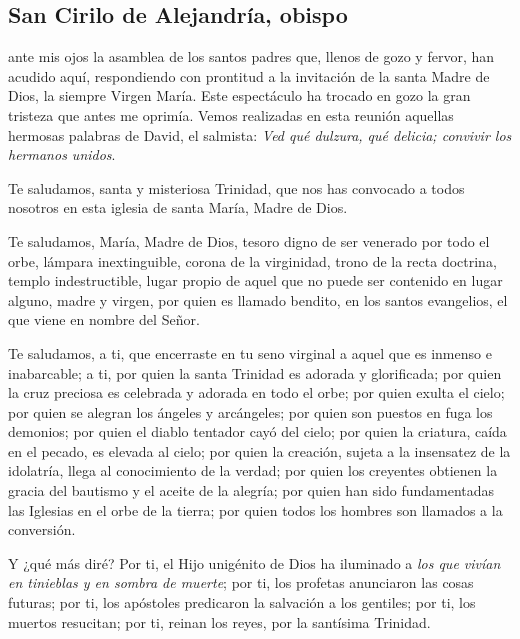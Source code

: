 \newsection

\subsection{San Cirilo de Alejandría, obispo}



\begin{body}
	 ante mis ojos la asamblea de los santos padres que, llenos de gozo y fervor, han acudido aquí, respondiendo con prontitud a la invitación de la santa Madre de Dios, la siempre Virgen María. Este espectáculo ha trocado en gozo la gran tristeza que antes me oprimía. Vemos realizadas en esta reunión aquellas hermosas palabras de David, el salmista: \emph{Ved qué dulzura, qué delicia; convivir los hermanos unidos}.
	
	Te saludamos, santa y misteriosa Trinidad, que nos has convocado a todos nosotros en esta iglesia de santa María, Madre de Dios.
	
	Te saludamos, María, Madre de Dios, tesoro digno de ser venerado por todo el orbe, lámpara inextinguible, corona de la virginidad, trono de la recta doctrina, templo indestructible, lugar propio de aquel que no puede ser contenido en lugar alguno, madre y virgen, por quien es llamado bendito, en los santos evangelios, el que viene en nombre del Señor.
	
	Te saludamos, a ti, que encerraste en tu seno virginal a aquel que es inmenso e inabarcable; a ti, por quien la santa Trinidad es adorada y glorificada; por quien la cruz preciosa es celebrada y adorada en todo el orbe; por quien exulta el cielo; por quien se alegran los ángeles y arcángeles; por quien son puestos en fuga los demonios; por quien el diablo tentador cayó del cielo; por quien la criatura, caída en el pecado, es elevada al cielo; por quien la creación, sujeta a la insensatez de la idolatría, llega al conocimiento de la verdad; por quien los creyentes obtienen la gracia del bautismo y el aceite de la alegría; por quien han sido fundamentadas las Iglesias en el orbe de la tierra; por quien todos los hombres son llamados a la conversión.
	
	Y ¿qué más diré? Por ti, el Hijo unigénito de Dios ha iluminado a \emph{los que vivían en tinieblas y en sombra de muerte}; por ti, los profetas anunciaron las cosas futuras; por ti, los apóstoles predicaron la salvación a los gentiles; por ti, los muertos resucitan; por ti, reinan los reyes, por la santísima Trinidad.
	

\end{body}
